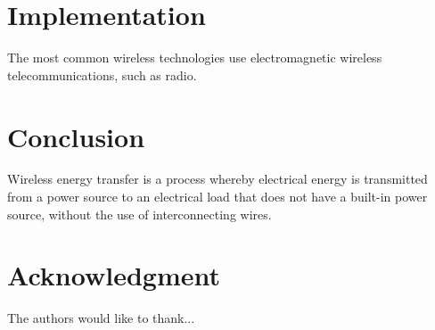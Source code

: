 \documentclass[conference]{IEEEtran}
\begin{document}
\section{Implementation}
The most common wireless technologies use electromagnetic
wireless telecommunications, such as radio.

\section{Conclusion}
Wireless energy transfer is a process whereby electrical
energy is transmitted from a power source to an electrical
load that does not have a built-in power source, without
the use of interconnecting wires.

\section*{Acknowledgment}

The authors would like to thank...


{}

\end{document}
